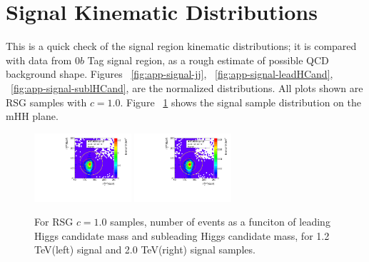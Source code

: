 \section{Signal Kinematic Distributions }
\label{app:signal-dist}

This is a quick check of the signal region kinematic distributions; it is compared with data from 0$b$ Tag signal region, as a rough estimate of possible QCD background shape. Figures ~\ref{fig:app-signal-jj}, ~\ref{fig:app-signal-leadHCand}, ~\ref{fig:app-signal-sublHCand}, are the normalized distributions. All plots shown are RSG samples with $c=1.0$. Figure ~\ref{fig:app-signal-mhh} shows the signal sample distribution on the mHH plane.


\begin{figure}[htbp!]
\begin{center}
\includegraphics[width=0.32\textwidth,angle=-90]{figures/boosted/Truth/Sig_1200_AllTag_Incl_mH0H1.pdf}
\includegraphics[width=0.32\textwidth,angle=-90]{figures/boosted/Truth/Sig_2000_AllTag_Incl_mH0H1.pdf}
\caption{For RSG $c=1.0$ samples, number of events as a funciton of leading Higgs candidate mass and subleading Higgs candidate mass, for 1.2 TeV(left) signal and 2.0 TeV(right) signal samples.}
\label{fig:app-signal-mhh}
\end{center}
\end{figure}

